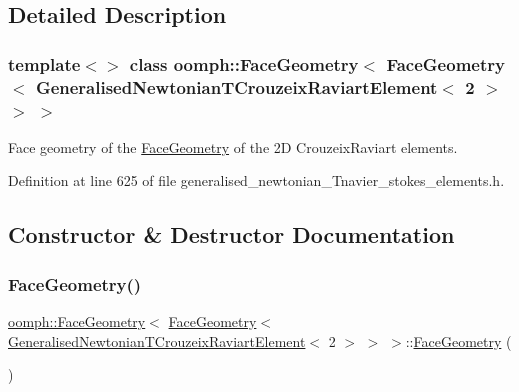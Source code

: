 \subsection{Detailed Description}
\subsubsection*{template$<$$>$\newline
class oomph\+::\+Face\+Geometry$<$ Face\+Geometry$<$ Generalised\+Newtonian\+T\+Crouzeix\+Raviart\+Element$<$ 2 $>$ $>$ $>$}

Face geometry of the \hyperlink{classoomph_1_1FaceGeometry}{Face\+Geometry} of the 2D Crouzeix\+Raviart elements. 

Definition at line 625 of file generalised\+\_\+newtonian\+\_\+\+Tnavier\+\_\+stokes\+\_\+elements.\+h.



\subsection{Constructor \& Destructor Documentation}
\mbox{\label{classoomph_1_1FaceGeometry_3_01FaceGeometry_3_01GeneralisedNewtonianTCrouzeixRaviartElement_3_012_01_4_01_4_01_4_a2c0b9faf48d7bc3220741d0413718676}} 
\subsubsection{\texorpdfstring{Face\+Geometry()}{FaceGeometry()}}
{\footnotesize\ttfamily \hyperlink{classoomph_1_1FaceGeometry}{oomph\+::\+Face\+Geometry}$<$ \hyperlink{classoomph_1_1FaceGeometry}{Face\+Geometry}$<$ \hyperlink{classoomph_1_1GeneralisedNewtonianTCrouzeixRaviartElement}{Generalised\+Newtonian\+T\+Crouzeix\+Raviart\+Element}$<$ 2 $>$ $>$ $>$\+::\hyperlink{classoomph_1_1FaceGeometry}{Face\+Geometry} (\begin{DoxyParamCaption}{ }\end{DoxyParamCaption})\hspace{0.3cm}{\ttfamily [inline]}}



